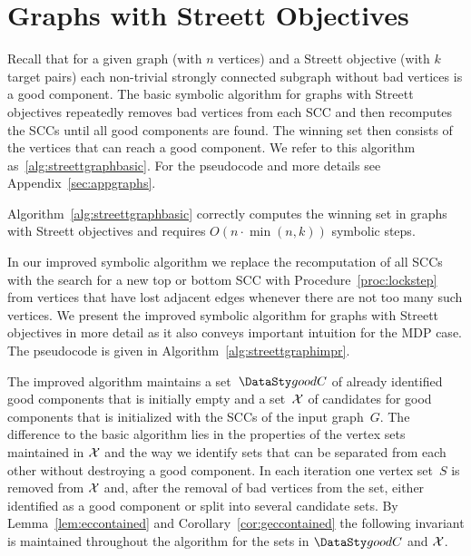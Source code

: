 \vspace{-3mm}
\section{Graphs with Streett Objectives}\label{sec:graphs}

\vspace{-1mm}
\smallskip{}
Recall that for a given graph (with $n$ vertices) and a Streett objective (with $k$ 
target pairs) each non-trivial strongly connected subgraph without bad vertices is
a good component. The basic symbolic algorithm for graphs with Streett objectives 
repeatedly removes bad vertices from each SCC and then recomputes the SCCs 
until all good components are found. The winning set then consists of the vertices
that can reach a good component. We refer to this
algorithm as~\ref{alg:streettgraphbasic}. For the pseudocode and more details
see Appendix~\ref{sec:appgraphs}.

\vspace{-0.5mm}
\begin{prp}\label{prp:basicgraphs}
Algorithm~\ref{alg:streettgraphbasic} correctly computes the winning set in
graphs with Streett objectives and requires $O(n \cdot \min(n,k))$ symbolic steps.
\end{prp}

\vspace{-0.5mm}
\smallskip{}
In our improved symbolic algorithm we replace the recomputation of all SCCs
with the search for a new top or bottom SCC with Procedure~\ref{proc:lockstep} 
from vertices that have lost adjacent edges whenever there are not too many such 
vertices. We present the improved symbolic algorithm for graphs with Streett objectives
in more detail as it also conveys important intuition for the MDP case.
The pseudocode is given in Algorithm~\ref{alg:streettgraphimpr}.

\vspace{-0.5mm}
\smallskip{}
The improved algorithm maintains a set~$\goodC$ of 
already identified good components that is initially empty
and a set~$\mathcal{X}$ of candidates for good components that is initialized with 
the SCCs of the input graph~$G$. The difference to the basic algorithm lies
in the properties of the vertex sets maintained in $\mathcal{X}$ and the way we identify 
sets that can be separated from each other without destroying a good component.
In each iteration one vertex set~$S$ is removed from $\mathcal{X}$ and, after 
the removal of bad vertices from the set, either identified as a good component or 
split into several candidate sets.
By Lemma~\ref{lem:eccontained} and Corollary~\ref{cor:geccontained}
the following invariant is maintained throughout the algorithm for the sets
 in $\goodC$ and $\mathcal{X}$.

